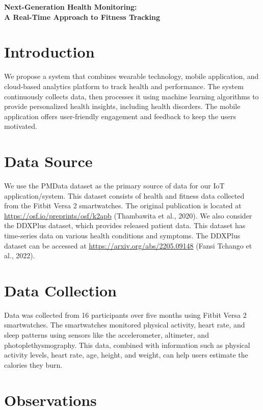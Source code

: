 \documentclass[10pt]{extarticle}
\begin{document}
\begin{center}
    {\LARGE \textbf{Next-Generation Health Monitoring:}} \\
    {\large \textbf{A Real-Time Approach to Fitness Tracking}}
\end{center}

\section{Introduction}

We propose a system that combines wearable technology, mobile application, and cloud-based analytics platform to track health and performance. The system continuously collects data, then processes it using machine learning algorithms to provide personalized health insights, including health disorders. The mobile application offers user-friendly engagement and feedback to keep the users motivated.

\section{Data Source}

We use the PMData dataset as the primary source of data for our IoT application/system. This dataset consists of health and fitness data collected from the Fitbit Versa 2 smartwatches. The original publication is located at \url{https://osf.io/preprints/osf/k2apb} (Thambawita et al., 2020). We also consider the DDXPlus dataset, which provides released patient data. This dataset has time-series data on various health conditions and symptoms. The DDXPlus dataset can be accessed at \url{https://arxiv.org/abs/2205.09148} (Fansi Tchango et al., 2022).

\section{Data Collection}

Data was collected from 16 participants over five months using Fitbit Versa 2 smartwatches. The smartwatches monitored physical activity, heart rate, and sleep patterns using sensors like the accelerometer, altimeter, and photoplethysmography. This data, combined with information such as physical activity levels, heart rate, age, height, and weight, can help users estimate the calories they burn.

\section{Observations}
\end{document}
